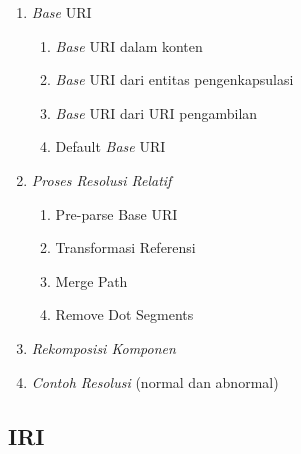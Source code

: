 \begin{enumerate}
    \item \textit{Base} URI
    \begin{enumerate}
        \item \textit{Base} URI dalam konten
        \item \textit{Base} URI dari entitas pengenkapsulasi
        \item \textit{Base} URI dari URI pengambilan
        \item Default \textit{Base} URI
    \end{enumerate}

    \item \textit{Proses Resolusi Relatif}
    \begin{enumerate}
        \item Pre-parse Base URI
        \item Transformasi Referensi
        \item Merge Path
        \item Remove Dot Segments
    \end{enumerate}

    \item \textit{Rekomposisi Komponen}
    
    \item \textit{Contoh Resolusi} (normal dan abnormal)
    
\end{enumerate}


\subsection{IRI}
\label{subsec:0202-iri}